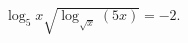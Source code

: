 \begin{ex}[type=equation]
	\begin{condition}
		$\log_5 x\sqrt{\log_{\sqrt{x} } (5x)} = -2.$
	\end{condition}
\end{ex}
